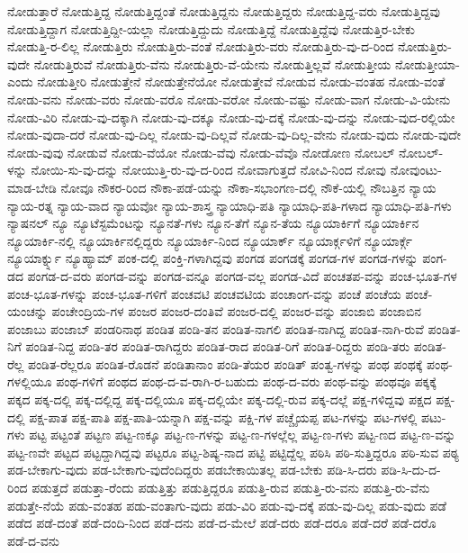 {ನೋಡುತ್ತಾರೆ
ನೋಡುತ್ತಿದ್ದ
ನೋಡುತ್ತಿದ್ದಂತೆ
ನೋಡುತ್ತಿದ್ದನು
ನೋಡುತ್ತಿದ್ದರು
ನೋಡುತ್ತಿದ್ದ-ವರು
ನೋಡುತ್ತಿದ್ದವು
ನೋಡುತ್ತಿದ್ದಾಗ
ನೋಡುತ್ತಿದ್ದೀ-ಯಲ್ಲಾ
ನೋಡುತ್ತಿದ್ದುದು
ನೋಡುತ್ತಿದ್ದೆ
ನೋಡುತ್ತಿದ್ದೆವು
ನೋಡುತ್ತಿರ-ಬೇಕು
ನೋಡುತ್ತಿ-ರ-ಲಿಲ್ಲ
ನೋಡುತ್ತಿರು
ನೋಡುತ್ತಿರು-ವಂತೆ
ನೋಡುತ್ತಿರು-ವರು
ನೋಡುತ್ತಿರು-ವು-ದ-ರಿಂದ
ನೋಡುತ್ತಿರು-ವುದೇ
ನೋಡುತ್ತಿರುವೆ
ನೋಡುತ್ತಿರು-ವೆನು
ನೋಡುತ್ತಿರು-ವೆ-ಯೇನು
ನೋಡುತ್ತಿಲ್ಲವೆ
ನೋಡುತ್ತೀಯ
ನೋಡುತ್ತೀಯಾ-ಎಂದು
ನೋಡುತ್ತೀರಿ
ನೋಡುತ್ತೇನೆ
ನೋಡುತ್ತೇನೆಯೋ
ನೋಡುತ್ತೇವೆ
ನೋಡುವ
ನೋಡು-ವಂತಹ
ನೋಡು-ವಂತೆ
ನೋಡು-ವನು
ನೋಡು-ವರು
ನೋಡು-ವರೊ
ನೋಡು-ವರೋ
ನೋಡು-ವಷ್ಟು
ನೋಡು-ವಾಗ
ನೋಡು-ವಿ-ಯೇನು
ನೋಡು-ವಿರಿ
ನೋಡು-ವು-ದಕ್ಕಾಗಿ
ನೋಡು-ವು-ದಕ್ಕೂ
ನೋಡು-ವು-ದಕ್ಕೆ
ನೋಡು-ವು-ದನ್ನು
ನೋಡು-ವುದ-ರಲ್ಲಿಯೇ
ನೋಡು-ವುದಾ-ದರೆ
ನೋಡು-ವು-ದಿಲ್ಲ
ನೋಡು-ವು-ದಿಲ್ಲವೆ
ನೋಡು-ವು-ದಿಲ್ಲ-ವೇನು
ನೋಡು-ವುದು
ನೋಡು-ವುದೇ
ನೋಡು-ವುವು
ನೋಡುವೆ
ನೋಡು-ವೆಯೋ
ನೋಡು-ವೆವು
ನೋಡು-ವೆವೊ
ನೋಡೋಣ
ನೋಬಲ್
ನೋಬಲ್-ಳನ್ನು
ನೋಯಿ-ಸು-ವು-ದನ್ನು
ನೋಯುತ್ತಿ-ರು-ವು-ದ-ರಿಂದ
ನೋವಾಗುತ್ತದೆ
ನೋವಿ-ನಿಂದ
ನೋವು
ನೋವುಂಟು-ಮಾಡ-ಬೇಡಿ
ನೋವೂ
ನೌಕರ-ರಿಂದ
ನೌಕಾ-ಪಡೆ-ಯನ್ನು
ನೌಕಾ-ಸಭಾಂಗಣ-ದಲ್ಲಿ
ನೌಕೆ-ಯಲ್ಲಿ
ನೌಬತ್ತಿನ
ನ್ಯಾಯ
ನ್ಯಾಯ-ರತ್ನ
ನ್ಯಾಯ-ವಾದ
ನ್ಯಾಯವೋ
ನ್ಯಾಯ-ಶಾಸ್ತ್ರ
ನ್ಯಾಯಾಧಿ-ಪತಿ
ನ್ಯಾಯಾಧಿ-ಪತಿ-ಗಳಾದ
ನ್ಯಾಯಾಧಿ-ಪತಿ-ಗಳು
ನ್ಯಾಷನಲ್
ನ್ಯೂ
ನ್ಯೂಟೆಸ್ಟಮೆಂಟನ್ನು
ನ್ಯೂನತೆ-ಗಳು
ನ್ಯೂನ-ತೆಗೆ
ನ್ಯೂನ-ತೆಯ
ನ್ಯೂಯಾರ್ಕಿಗೆ
ನ್ಯೂಯಾರ್ಕಿನ
ನ್ಯೂಯಾರ್ಕಿ-ನಲ್ಲಿ
ನ್ಯೂಯಾರ್ಕಿನಲ್ಲಿದ್ದರು
ನ್ಯೂಯಾರ್ಕಿ-ನಿಂದ
ನ್ಯೂಯಾರ್ಕ್
ನ್ಯೂಯಾರ್ಕ್ಗಳಿಗೆ
ನ್ಯೂಯಾರ್ಕ್ಗೆ
ನ್ಯೂಯಾರ್ಕ್ನ್ನು
ನ್ಯೂಹ್ಯಾಮ್
ಪಂಕ-ದಲ್ಲಿ
ಪಂಕ್ತಿ-ಗಳಾಗಿದ್ದವು
ಪಂಗಡ
ಪಂಗಡಕ್ಕೆ
ಪಂಗಡ-ಗಳ
ಪಂಗಡ-ಗಳನ್ನು
ಪಂಗ-ಡದ
ಪಂಗಡ-ದ-ವರು
ಪಂಗಡ-ವನ್ನು
ಪಂಗಡ-ವನ್ನೂ
ಪಂಗಡ-ವಲ್ಲ
ಪಂಗಡ-ವಿದೆ
ಪಂಚತಪ-ವನ್ನು
ಪಂಚ-ಭೂತ-ಗಳ
ಪಂಚ-ಭೂತ-ಗಳನ್ನು
ಪಂಚ-ಭೂತ-ಗಳಿಗೆ
ಪಂಚವಟಿ
ಪಂಚವಟಿಯ
ಪಂಚಾಂಗ-ವನ್ನು
ಪಂಚೆ
ಪಂಚೆಯ
ಪಂಚೆ-ಯಂಚನ್ನು
ಪಂಚೇಂದ್ರಿಯ-ಗಳ
ಪಂಜರ
ಪಂಜರ-ದಂತಿವೆ
ಪಂಜರ-ದಲ್ಲಿ
ಪಂಜರ-ವನ್ನು
ಪಂಜಾಬಿ
ಪಂಜಾಬಿನ
ಪಂಜಾಬು
ಪಂಜಾಬ್
ಪಂಡರಿನಾಥ
ಪಂಡಿತ
ಪಂಡಿ-ತನ
ಪಂಡಿತ-ನಾಗಲಿ
ಪಂಡಿತ-ನಾಗಿದ್ದ
ಪಂಡಿತ-ನಾಗಿ-ರುವೆ
ಪಂಡಿತ-ನಿಗೆ
ಪಂಡಿತ-ನಿದ್ದ
ಪಂಡಿ-ತರ
ಪಂಡಿತ-ರಾಗಿದ್ದರು
ಪಂಡಿತ-ರಾದ
ಪಂಡಿತ-ರಿಗೆ
ಪಂಡಿತ-ರಿದ್ದರು
ಪಂಡಿ-ತರು
ಪಂಡಿತ-ರೆಲ್ಲ
ಪಂಡಿತ-ರೆಲ್ಲರೂ
ಪಂಡಿತ-ರೊಡನೆ
ಪಂಡಿತಾನಾಂ
ಪಂಡಿ-ತೆಯರ
ಪಂಡಿತ್
ಪಂತ್ವ-ಗಳನ್ನು
ಪಂಥ
ಪಂಥಕ್ಕೆ
ಪಂಥ-ಗಳಲ್ಲಿಯೂ
ಪಂಥ-ಗಳಿಗೆ
ಪಂಥದ
ಪಂಥ-ದ-ವ-ರಾಗಿ-ರ-ಬಹುದು
ಪಂಥ-ದ-ವರು
ಪಂಥ-ವನ್ನು
ಪಂಥವೂ
ಪಕ್ಕಕ್ಕೆ
ಪಕ್ಕದ
ಪಕ್ಕ-ದಲ್ಲಿ
ಪಕ್ಕ-ದಲ್ಲಿದ್ದ
ಪಕ್ಕ-ದಲ್ಲಿಯೂ
ಪಕ್ಕ-ದಲ್ಲಿಯೇ
ಪಕ್ಕ-ದಲ್ಲಿ-ರುವ
ಪಕ್ಕ-ದಲ್ಲೆ
ಪಕ್ಷ-ಗಳಿದ್ದವು
ಪಕ್ಷದ
ಪಕ್ಷ-ದಲ್ಲಿ
ಪಕ್ಷ-ಪಾತ
ಪಕ್ಷ-ಪಾತಿ
ಪಕ್ಷ-ಪಾತಿ-ಯನ್ನಾಗಿ
ಪಕ್ಷ-ವನ್ನು
ಪಕ್ಷಿ-ಗಳ
ಪಚ್ಚೈಯಪ್ಪ
ಪಟ-ಗಳನ್ನು
ಪಟ-ಗಳಲ್ಲಿ
ಪಟು-ಗಳು
ಪಟ್ಟ
ಪಟ್ಟಂತೆ
ಪಟ್ಟಣ
ಪಟ್ಟ-ಣಕ್ಕೂ
ಪಟ್ಟ-ಣ-ಗಳನ್ನು
ಪಟ್ಟ-ಣ-ಗಳಲ್ಲೆಲ್ಲ
ಪಟ್ಟ-ಣ-ಗಳು
ಪಟ್ಟ-ಣದ
ಪಟ್ಟ-ಣ-ವನ್ನು
ಪಟ್ಟ-ಣವೇ
ಪಟ್ಟದ
ಪಟ್ಟದ್ದಾಗಿದ್ದವು
ಪಟ್ಟರೂ
ಪಟ್ಟ-ಶಿಷ್ಯ-ನಾದ
ಪಟ್ಟಿ
ಪಟ್ಟಿದ್ದೆಲ್ಲ
ಪಠಿಸಿ
ಪಠಿ-ಸುತ್ತಿದ್ದರೂ
ಪಠಿ-ಸುವ
ಪಠ್ಯ
ಪಡ-ಬೇಕಾಗು-ವುದು
ಪಡ-ಬೇಕಾಗು-ವುದೆಂದಿದ್ದರು
ಪಡಬೇಕಾಯಿತಲ್ಲ
ಪಡ-ಬೇಕು
ಪಡಿ-ಸಿ-ದರು
ಪಡಿ-ಸಿ-ದು-ದ-ರಿಂದ
ಪಡುತ್ತದೆ
ಪಡುತ್ತಾ-ರೆಂದು
ಪಡುತ್ತಿತ್ತು
ಪಡುತ್ತಿದ್ದರೂ
ಪಡುತ್ತಿ-ರುವ
ಪಡುತ್ತಿ-ರು-ವನು
ಪಡುತ್ತಿ-ರು-ವೆನು
ಪಡುತ್ತೇ-ನೆಯೆ
ಪಡು-ವಂತಹ
ಪಡು-ವಂತಾಗು-ವುದು
ಪಡು-ವಿರಿ
ಪಡು-ವು-ದಕ್ಕೆ
ಪಡು-ವು-ದಿಲ್ಲ
ಪಡು-ವುದು
ಪಡೆ
ಪಡೆದ
ಪಡೆ-ದಂತೆ
ಪಡೆ-ದಂದಿ-ನಿಂದ
ಪಡೆ-ದನು
ಪಡೆ-ದ-ಮೇಲೆ
ಪಡೆ-ದರು
ಪಡೆ-ದರೂ
ಪಡೆ-ದರೆ
ಪಡೆ-ದರೊ
ಪಡೆ-ದ-ವನು
}

